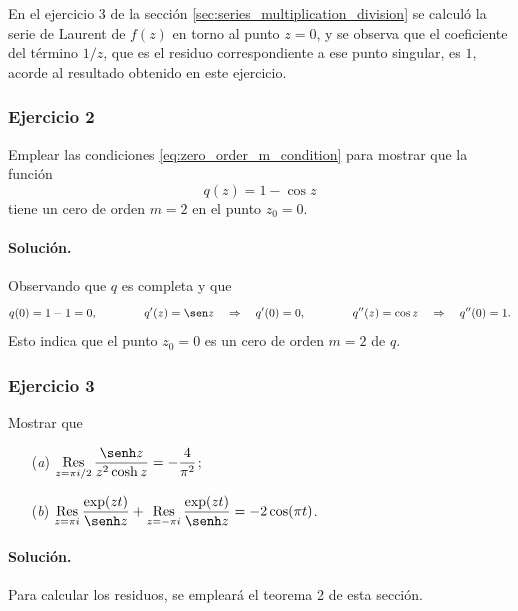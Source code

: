 \documentclass[a4paper]{report}
\def\Res{\qopname\relax m{Res}}
\begin{document}
En el ejercicio 3 de la sección \ref{sec:series_multiplication_division} se calculó la serie de Laurent de \(f(z)\) en torno al punto \(z=0\), y se observa que el coeficiente del término \(1/z\), que es el residuo correspondiente a ese punto singular, es \(1\), acorde al resultado obtenido en este ejercicio.



\subsubsection{Ejercicio 2} 
 
Emplear las condiciones \ref{eq:zero_order_m_condition} para mostrar que la función 
\[
q(z)=1-\cos z 
\]
tiene un cero de orden \(m=2\) en el punto \(z_0=0\). 

\paragraph{Solución.} Observando que \(q\) es completa y que
\[
 q(0)=1-1=0,
 \qquad\qquad 
 q'(z)=\sen z
 \quad\Rightarrow\quad 
 q'(0)=0,
 \qquad\qquad 
 q''(z)=\cos z
 \quad\Rightarrow\quad 
 q''(0)=1.
\]
Esto indica que el punto \(z_0=0\) es un cero de orden \(m=2\) de \(q\).

\subsubsection{Ejercicio 3}

Mostrar que 
\begin{enumerate}
 \item[(\textit{a})] \(\displaystyle\Res_{z=\pi i/2}\frac{\senh z}{z^2\cosh z}=-\frac{4}{\pi^2}\);
 \item[(\textit{b})] 
 \(\displaystyle\Res_{z=\pi i}\frac{\exp(zt)}{\senh z}+\Res_{z=-\pi i}\frac{\exp(zt)}{\senh z}=-2\cos(\pi t)\).
\end{enumerate}

\paragraph{Solución.} 

Para calcular los residuos, se empleará el teorema 2 de esta sección.
\end{document}
